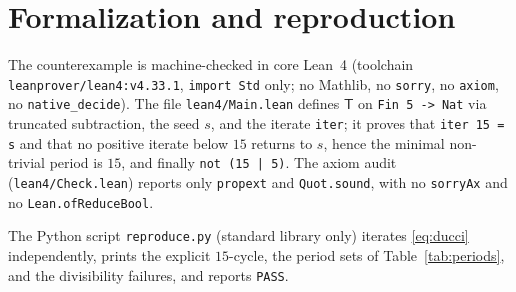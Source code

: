 \documentclass[11pt]{article}
\theoremstyle{definition}
\newcommand{\T}{\mathsf{T}}
\begin{document}
\section{Formalization and reproduction}

The counterexample is machine-checked in core Lean~4 (toolchain
\texttt{leanprover/lean4:v4.33.1}, \texttt{import Std} only; no Mathlib, no
\texttt{sorry}, no \texttt{axiom}, no \texttt{native\_decide}). The file
\texttt{lean4/Main.lean} defines $\T$ on \texttt{Fin 5 -> Nat} via truncated
subtraction, the seed $s$, and the iterate \texttt{iter}; it proves that
\texttt{iter 15 = s} and that no positive iterate below $15$ returns to $s$,
hence the minimal non-trivial period is $15$, and finally \texttt{not (15 | 5)}.
The axiom audit (\texttt{lean4/Check.lean}) reports only \texttt{propext} and
\texttt{Quot.sound}, with no \texttt{sorryAx} and no \texttt{Lean.ofReduceBool}.

The Python script \texttt{reproduce.py} (standard library only) iterates
\eqref{eq:ducci} independently, prints the explicit $15$-cycle, the period sets
of Table~\ref{tab:periods}, and the divisibility failures, and reports
\texttt{PASS}.
\end{document}

